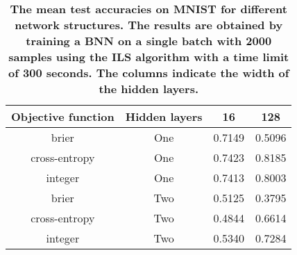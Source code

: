 \begin{center}
\begin{table}[!tb]
\centering
\begin{tabular}{|c|c|c|c|}
  \hline
Objective function & Hidden layers & 16 & 128 \\ 
  \hline
brier & One & 0.7149 & 0.5096 \\ 
   \hline
cross-entropy & One & 0.7423 & 0.8185 \\ 
   \hline
integer & One & 0.7413 & 0.8003 \\ 
   \hline
brier & Two & 0.5125 & 0.3795 \\ 
   \hline
cross-entropy & Two & 0.4844 & 0.6614 \\ 
   \hline
integer & Two & 0.5340 & 0.7284 \\ 
   \hline
\end{tabular}
\caption{\small{\textbf{The mean test accuracies on MNIST for different network structures. The results are obtained by training a BNN
            on a single batch with 2000 samples using the ILS algorithm with a time limit of 300 seconds.
            The columns indicate the width of the hidden layers.}}} 
\label{SBT_DNS}
\end{table}

\end{center}
